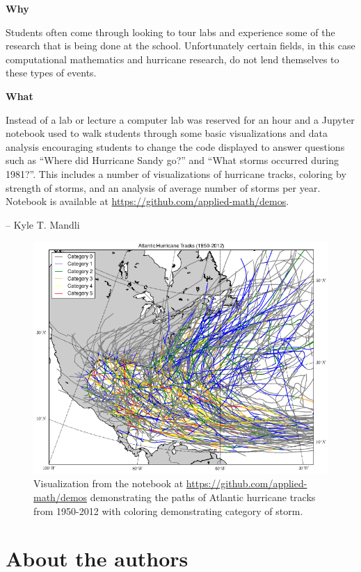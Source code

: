 \documentclass[]{book}
\begin{document}
\textbf{Why}

Students often come through looking to tour labs and experience some of
the research that is being done at the school. Unfortunately certain
fields, in this case computational mathematics and hurricane research,
do not lend themselves to these types of events.

\textbf{What}

Instead of a lab or lecture a computer lab was reserved for an hour and
a Jupyter notebook used to walk students through some basic
visualizations and data analysis encouraging students to change the code
displayed to answer questions such as ``Where did Hurricane Sandy go?''
and ``What storms occurred during 1981?''. This includes a number of
visualizations of hurricane tracks, coloring by strength of storms, and
an analysis of average number of storms per year. Notebook is available
at \url{https://github.com/applied-math/demos}.

-- Kyle T. Mandli

\begin{figure}
\centering
\includegraphics{images/hurricanes.png}
\caption{Visualization from the notebook at
\url{https://github.com/applied-math/demos} demonstrating the paths of
Atlantic hurricane tracks from 1950-2012 with coloring demonstrating
category of storm.}
\end{figure}

\hypertarget{authors}{\chapter{About the authors}\label{authors}}
\end{document}
